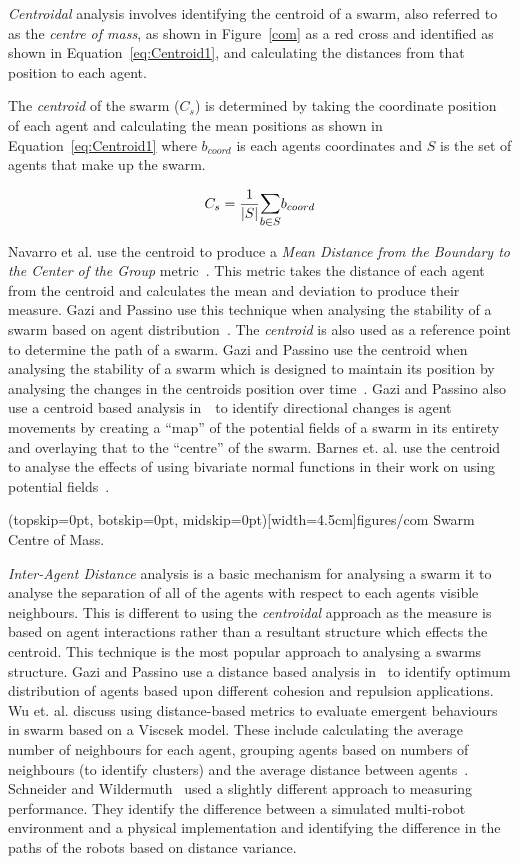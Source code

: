 \documentclass{ieeeaccess}
\newcommand{\card}[1]{\vert{#1}\vert}
\begin{document}
\textit{Centroidal} analysis involves identifying the centroid of a swarm, also referred to as the \textit{centre of mass}, as shown in Figure~\ref{com} as a red cross and identified as shown in Equation~\ref{eq:Centroid1}, and calculating the distances from that position to each agent. 

The \textit{centroid} of the swarm ($C_s$) is determined by taking the coordinate position of each agent and calculating the mean positions as shown in Equation~\ref{eq:Centroid1} where $b_{coord}$ is each agents coordinates and $S$ is the set of agents that make up the swarm.

\begin{equation}\label{eq:Centroid1}
C_s = \frac{1}{\card{S}}\mathlarger{\sum_{b \in S}} b_{coord}
\end{equation}

 Navarro et al. use the centroid to produce a \textit{Mean Distance from the Boundary to the Center of the Group} metric~\cite{NIM:09}. This metric takes the distance of each agent from the centroid and calculates the mean and deviation to produce their measure. Gazi and Passino use this technique when analysing the stability of a swarm based on agent distribution~\cite{GP:11}. The \textit{centroid} is also used as a reference point to determine the path of a swarm. Gazi and Passino use the centroid when analysing the stability of a swarm which is designed to maintain its position by analysing the changes in the centroids position over time~\cite{GP:04}. Gazi and Passino also use a centroid based analysis in~\cite{GP:02}~to identify directional changes is agent movements by creating a ``map'' of the potential fields of a swarm in its entirety and overlaying that to the ``centre'' of the swarm.  Barnes et. al. use the centroid to analyse the effects of using bivariate normal functions in their work on using potential fields~\cite{BAF:06, BAFVM:06}. 

\Figure[t!](topskip=0pt, botskip=0pt, midskip=0pt)[width=4.5cm]{figures/com}
{Swarm Centre of Mass.\label{com}}

\textit{Inter-Agent Distance} analysis is a basic mechanism for analysing a swarm it to analyse the separation of all of the agents with respect to each agents visible neighbours. This is different to using the \textit{centroidal} approach as the measure is based on agent interactions rather than a resultant structure which effects the centroid. This technique is the most popular approach to analysing a swarms structure. Gazi and Passino use a distance based analysis in~\cite{GP:04, GP:11} to identify optimum distribution of agents based upon different cohesion and repulsion applications. Wu et. al. discuss using distance-based metrics to evaluate emergent behaviours in swarm based on a Viscsek model. These include calculating the average number of neighbours for each agent, grouping agents based on numbers of neighbours (to identify clusters) and the average distance between agents~\cite{WCW:11}. Schneider and Wildermuth~\cite{SW:03} used a slightly different approach to measuring performance. They identify the difference between a simulated multi-robot environment and a physical implementation and identifying the difference in the paths of the robots based on distance variance.
\end{document}
